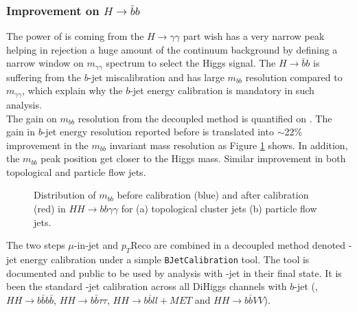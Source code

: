 \subsubsection{Improvement on $H\rightarrow\bar{b}b$}
 The power of \HHyybb is coming from the $H\rightarrow\gamma\gamma$ part wish has a very narrow peak helping in rejection a huge amount of the continuum background by defining a narrow window on $m_{\gamma\gamma}$ spectrum to select the Higgs signal. The $H\rightarrow\bar{b}b$ is suffering from the $b$-jet miscalibration and has  large $m_{bb}$ resolution compared to $m_{\gamma\gamma}$, which explain why the $b$-jet energy calibration is mandatory in such analysis.\\
The gain on $m_{bb}$ resolution from the decoupled method is quantified on \HHyybb. The gain in $b$-jet energy resolution reported before is translated into $\sim$22\% improvement in the $m_{bb}$ invariant mass resolution as Figure \ref{fig:Jet:Cal:BCal:Result:mbb} shows. In addition, the $m_{bb}$ peak position get closer to the Higgs mass. Similar improvement in both topological and particle flow jets.
\begin{figure}[htbp]
   \centering
   \quad
   \begin{tcolorbox}[colback=black!5!white,colframe=white!75!black]
   \caption{Distribution of $m_{bb}$ before calibration (blue) and after calibration (red) in $HH\rightarrow bb\gamma\gamma$ for (a) topological cluster jets (b) particle flow jets.}
   \label{fig:Jet:Cal:BCal:Result:mbb}
   \end{tcolorbox}
\end{figure}
The two steps $\mu$-in-jet and $p_T$Reco are combined in a decoupled method denoted \bq-jet energy calibration under a simple \texttt{BJetCalibration} tool. The tool is documented and public to be used by analysis with \bq-jet in their final state. It is been the standard \bq-jet calibration across all DiHiggs channels with $b$-jet (\HHyybb, $HH\rightarrow b\bar{b}b\bar{b}$, $HH\rightarrow b\bar{b}\tau\tau$,  $HH\rightarrow b\bar{b}ll+MET$ and $HH\rightarrow b\bar{b}VV$).

